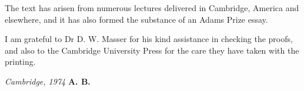 The text has arisen from numerous lectures delivered in Cambridge, America and elsewhere, and it has also formed the substance of an Adams Prize essay.

I am grateful to Dr D. W. Masser for his kind assistance in checking the proofs, and also to the Cambridge University Press for the care they have taken with the printing.

\vspace{1em}

\noindent
\textit{Cambridge, 1974} \hfill \textbf{A. B.}

